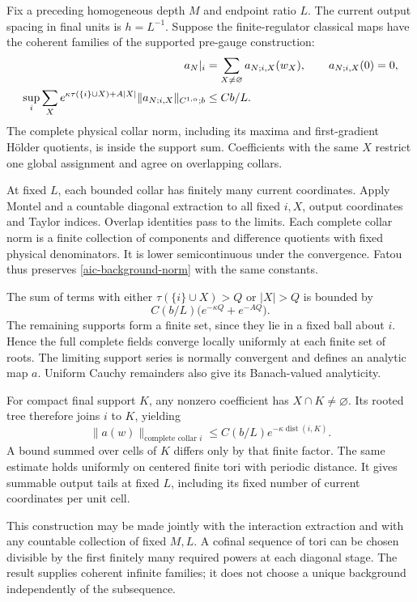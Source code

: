 \documentclass[11pt]{article}
\theoremstyle{remark}
\begin{document}
Fix a preceding homogeneous depth \(M\) and endpoint ratio \(L\).
The current output spacing in final units is \(h=L^{-1}\).
Suppose the finite-regulator classical maps have the coherent
families of the supported pre-gauge construction:
\begin{align}
 a_N|_i&=\sum_{X\ne\varnothing}a_{N;i,X}(w_X),
       \qquad a_{N;i,X}(0)=0,\notag\\
 \sup_i\sum_X e^{\kappa\tau(\{i\}\cup X)+A|X|}
       \|a_{N;i,X}\|_{C^{1,\alpha};b}
       &\le Cb/L .
 \label{aic-background-norm}
\end{align}
The complete physical collar norm, including its maxima and
first-gradient H\"older quotients, is inside the support sum.
Coefficients with the same \(X\) restrict one global assignment
and agree on overlapping collars.

At fixed \(L\), each bounded collar has finitely many current
coordinates. Apply Montel and a countable diagonal extraction
to all fixed \(i,X\), output coordinates and Taylor indices.
Overlap identities pass to the limits. Each complete collar
norm is a finite collection of components and difference
quotients with fixed physical denominators. It is lower
semicontinuous under the convergence. Fatou thus preserves
\eqref{aic-background-norm} with the same constants.

The sum of terms with either
\(\tau(\{i\}\cup X)>Q\) or \(|X|>Q\) is bounded by
\[
 C(b/L)\bigl(e^{-\kappa Q}+e^{-AQ}\bigr).
\]
The remaining supports form a finite set, since they lie in
a fixed ball about \(i\). Hence the full complete fields
converge locally uniformly at each finite set of roots.
The limiting support series is normally convergent and
defines an analytic map \(a\). Uniform Cauchy remainders
also give its Banach-valued analyticity.

For compact final support \(K\), any nonzero coefficient has
\(X\cap K\ne\varnothing\). Its rooted tree therefore joins
\(i\) to \(K\), yielding
\begin{equation}
 \|a(w)\|_{\text{complete collar }i}
        \le C(b/L)e^{-\kappa\operatorname{dist}(i,K)}.
 \label{aic-background-tail}
\end{equation}
A bound summed over cells of \(K\) differs only by that finite
factor. The same estimate holds uniformly on centered finite
tori with periodic distance. It gives summable output tails
at fixed \(L\), including its fixed number of current coordinates
per unit cell.

This construction may be made jointly with the interaction
extraction and with any countable collection of fixed \(M,L\).
A cofinal sequence of tori can be chosen divisible by the first
finitely many required powers at each diagonal stage. The
result supplies coherent infinite families; it does not choose
a unique background independently of the subsequence.
\end{document}
